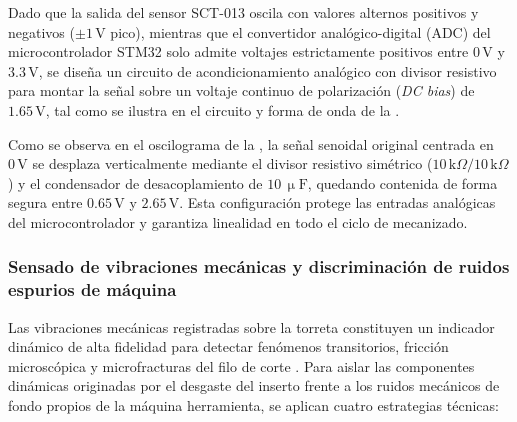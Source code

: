 Dado que la salida del sensor SCT-013 oscila con valores alternos positivos y negativos ($\pm 1\,\text{V}$ pico), mientras que el convertidor analógico-digital (ADC) del microcontrolador STM32 solo admite voltajes estrictamente positivos entre $0\,\text{V}$ y $3.3\,\text{V}$, se diseña un circuito de acondicionamiento analógico con divisor resistivo para montar la señal sobre un voltaje continuo de polarización (\textit{DC bias}) de $1.65\,\text{V}$, tal como se ilustra en el circuito y forma de onda de la .


Como se observa en el oscilograma de la , la señal senoidal original centrada en $0\,\text{V}$ se desplaza verticalmente mediante el divisor resistivo simétrico ($10\,\text{k}\Omega / 10\,\text{k}\Omega$) y el condensador de desacoplamiento de $10\,\upmu\text{F}$, quedando contenida de forma segura entre $0.65\,\text{V}$ y $2.65\,\text{V}$. Esta configuración protege las entradas analógicas del microcontrolador y garantiza linealidad en todo el ciclo de mecanizado.


\subsubsection{Sensado de vibraciones mecánicas y discriminación de ruidos espurios de máquina}

Las vibraciones mecánicas registradas sobre la torreta constituyen un indicador dinámico de alta fidelidad para detectar fenómenos transitorios, fricción microscópica y microfracturas del filo de corte \citep{wang2024}. Para aislar las componentes dinámicas originadas por el desgaste del inserto frente a los ruidos mecánicos de fondo propios de la máquina herramienta, se aplican cuatro estrategias técnicas:

